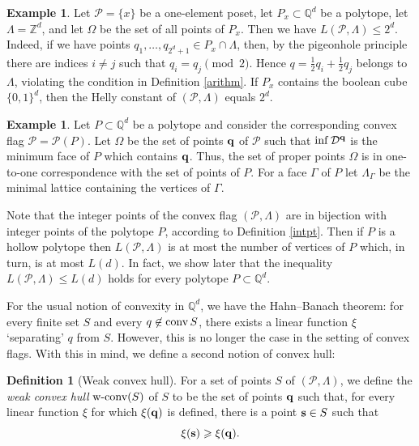\documentclass{daj}
\renewcommand{\le}{\leqslant}
\renewcommand{\ge}{\geqslant}
\newcommand{\Q}{\mathbb Q}
\newcommand{\Z}{\mathbb Z}
\newcommand{\conv}{{\rm conv}\,}
\newcommand{\D}{\mathcal D}
\renewcommand{\P}{\mathcal P}
\newcommand{\wc}{\mbox{\rm w-conv}}
\theoremstyle{definition}
\newtheorem{defi}[theorem]{Definition}
\theoremstyle{remark}
\theoremstyle{definition}
\newtheorem{example}[theorem]{Example}
\theoremstyle{definition}
\begin{document}
\begin{example}
    Let $\P = \{x\}$ be a one-element poset, let $P_x \subset \Q^d$ be a polytope, let $\Lambda = \Z^d$, and let $\Omega$ be the set of all points of $P_x$. Then we have $L(\P, \Lambda) \le 2^d$. Indeed, if we have points $q_1, \ldots, q_{2^d+1} \in P_x \cap \Lambda$, then, by the pigeonhole principle there are indices $i \neq j$ such that $q_i = q_j \pmod 2$. Hence $q = \frac12 q_i + \frac12 q_j$ belongs to $\Lambda$, violating the condition in Definition \ref{arithm}. If $P_x$ contains the boolean cube $\{0, 1\}^d$, then the Helly constant of $(\P, \Lambda)$ equals $2^d$.
\end{example}


\begin{example}\label{exmpl}
    Let $P \subset \Q^d$ be a polytope and consider the corresponding convex flag $\P = \P(P)$. Let $\Omega$ be the set of points $\bf q$ of $\P$ such that $\inf \D^{\bf q}$ is the minimum face of $P$ which contains $\bf q$. Thus, the set of proper points $\Omega$ is in one-to-one correspondence with the set of points of $P$. For a face $\Gamma$ of $P$ let $\Lambda_\Gamma$ be the minimal lattice containing the vertices of $\Gamma$.
    
    Note that the integer points of the convex flag $(\P, \Lambda)$ are in bijection with integer points of the polytope $P$, according to Definition \ref{intpt}. Then if $P$ is a hollow polytope then $L(\P, \Lambda)$ is at most the number of vertices of $P$ which, in turn, is at most $L(d)$. 
    In fact, we show later that the inequality $L(\P, \Lambda) \le L(d)$ holds for every polytope $P \subset \Q^d$.
\end{example}

For the usual notion of convexity in $\Q^d$, we have the Hahn--Banach theorem: for every finite set $S$ and every $q \not \in \conv S$, there exists a linear function $\xi$ `separating' $q$ from $S$. However, this is no longer the case in the setting of convex flags. With this in mind, we define a second notion of convex hull:

\begin{defi}[Weak convex hull]\label{defwc}
For a set of points $S$ of $(\P, \Lambda)$, we define the {\it weak convex hull} $\wc(S)$ of $S$ to be the set of points ${\bf q}$ such that, for every linear function $\xi$ for which $\xi({\bf q})$ is defined, there is a point ${\bf s} \in S$ such that 
$$
\xi({\bf s}) \ge \xi({\bf q}).
$$
\end{defi}
\end{document}
